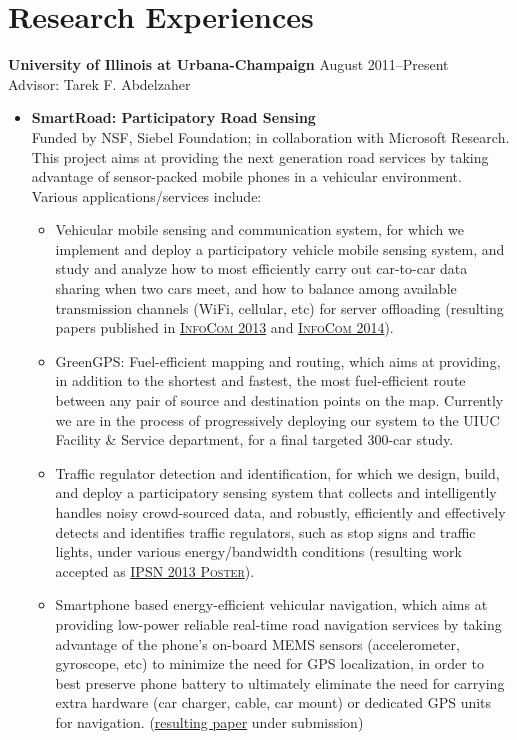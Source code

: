 \section{\sc Research Experiences} {\bf University of Illinois at Urbana-Champaign} \hfill August 2011--Present\\
Advisor: Tarek F. Abdelzaher 
\begin{itemize}
	\item \textbf{SmartRoad: Participatory Road Sensing} \\
	Funded by NSF, Siebel Foundation; in collaboration with Microsoft Research. This project aims at providing the next generation road services by taking advantage of sensor-packed mobile phones in a vehicular environment. Various applications/services include: 
	\begin{itemize}
		\item Vehicular mobile sensing and communication system, for which we implement and deploy a participatory vehicle mobile sensing system, and study and analyze how to most efficiently carry out car-to-car data sharing when two cars meet, and how to balance among available transmission channels (WiFi, cellular, etc) for server offloading (resulting papers published in \hyperlink{liu2013infocom}{\textsc{InfoCom 2013}} and \hyperlink{hu2014infocom}{\textsc{InfoCom 2014}}).
		
		\item GreenGPS: Fuel-efficient mapping and routing, which aims at providing, in addition to the shortest and fastest, the most fuel-efficient route between any pair of source and destination points on the map. Currently we are in the process of progressively deploying our system to the UIUC Facility \& Service department, for a final targeted 300-car study.
		
		\item Traffic regulator detection and identification, for which we design, build, and deploy a participatory sensing system that collects and intelligently handles noisy crowd-sourced data, and robustly, efficiently and effectively detects and identifies traffic regulators, such as stop signs and traffic lights, under various energy/bandwidth conditions (resulting work accepted as \hyperlink{hu2013ipsn}{\textsc{IPSN 2013 Poster}}).
		
		\item Smartphone based energy-efficient vehicular navigation, which aims at providing low-power reliable real-time road navigation services by taking advantage of the phone's on-board MEMS sensors (accelerometer, gyroscope, etc) to minimize the need for GPS localization, in order to best preserve phone battery to ultimately eliminate the need for carrying extra hardware (car charger, cable, car mount) or dedicated GPS units for navigation. (\hyperlink{}{resulting paper} under submission) 
	\end{itemize}
	

\end{itemize}
